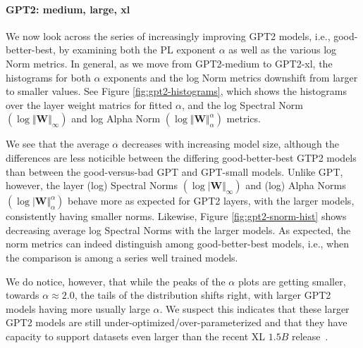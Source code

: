\paragraph{GPT2: medium, large, xl} 

We now look across the series of increasingly improving GPT2 models, i.e., good-better-best, by examining both the PL exponent $\alpha$ as well as the various log Norm metrics.  
In general, as we move from GPT2-medium to GPT2-xl, the histograms for both $\alpha$ exponents and the log Norm metrics downshift from larger to smaller values. 
See Figure \ref{fig:gpt2-histograms}, which shows the histograms over the layer weight matrics
for fitted $\alpha$, and the log Spectral Norm
 $(\log\Vert\mathbf{W}\Vert_{\infty})$  
and log Alpha Norm
 $(\log\Vert\mathbf{W}\Vert_{\alpha}^{\alpha})$ 
metrics.

We see that the average $\alpha$ decreases with increasing model size, although the differences are less noticible between the differing good-better-best GTP2 models than between the good-versus-bad GPT and GPT-small models.
Unlike GPT, however, the layer (log) Spectral Norms $(\log\vert\mathbf{W}\Vert_{\infty})$ and (log) Alpha Norms $(\log\vert\mathbf{W}\Vert_{\alpha}^{\alpha})$ behave more as expected for GPT2 layers, with the larger models, consistently having smaller norms. 
Likewise, Figure \ref{fig:gpt2-snorm-hist} shows decreasing average log Spectral Norms with the larger models.  
As expected, the norm metrics can indeed distinguish among good-better-best models, i.e., when the comparison is among a series well trained models.

We do notice, however, that while the peaks of the $\alpha$ plots are getting smaller, towards $\alpha\approx 2.0$, the tails of the distribution shifts right, with larger GPT2 models having more usually large $\alpha$.  
We suspect this indicates that these larger GPT2 models are still under-optimized/over-parameterized and that they have capacity to support datasets even larger than the recent XL $1.5B$ release~\cite{gpt2-xl}.



